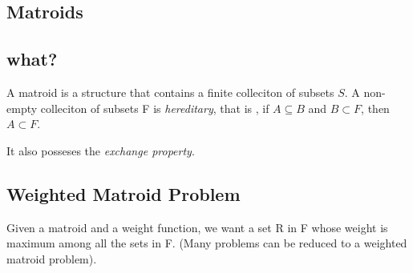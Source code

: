 \documentclass[portrait,10pt, a4paper]{article}
\begin{document}
\begin{multicols*}{3}
\section{Matroids}
		\subsection{what?}
			A matroid is a structure that contains a finite colleciton of subsets $S$. A non-empty colleciton of
			subsets F is \textit{hereditary}, that is , if $A\subseteq B$ and $B \subset F$, then $A \subset F$.

			It also posseses the \textit{exchange property}. 

		\subsection{Weighted Matroid Problem}
			Given  a  matroid and a weight function, we want a set R in F whose weight is maximum among all the sets in F.
			(Many problems can be reduced to a weighted matroid problem).

\end{multicols*}
\end{document}
